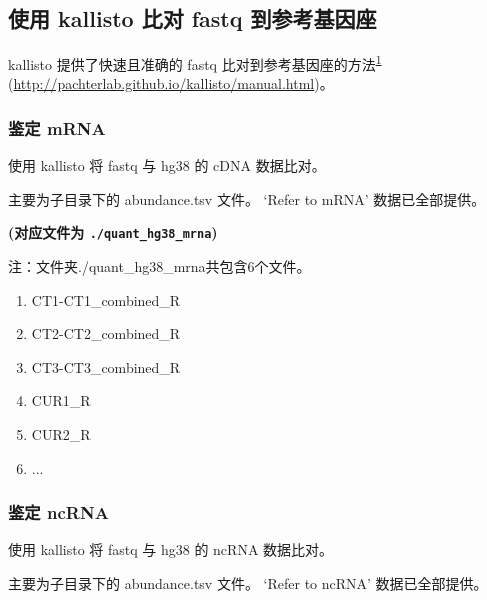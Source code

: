 \documentclass[
]{article}
\providecommand{\tightlist}{%
  \setlength{\itemsep}{0pt}\setlength{\parskip}{0pt}}
\begin{document}
\hypertarget{ux4f7fux7528-kallisto-ux6bd4ux5bf9-fastq-ux5230ux53c2ux8003ux57faux56e0ux5ea7}{%
\subsection{使用 kallisto 比对 fastq 到参考基因座}\label{ux4f7fux7528-kallisto-ux6bd4ux5bf9-fastq-ux5230ux53c2ux8003ux57faux56e0ux5ea7}}

kallisto 提供了快速且准确的 fastq 比对到参考基因座的方法\textsuperscript{\protect\hyperlink{ref-NearOptimalPrBray2016}{1}} (\url{http://pachterlab.github.io/kallisto/manual.html})。

\hypertarget{ux9274ux5b9a-mrna}{%
\subsubsection{鉴定 mRNA}\label{ux9274ux5b9a-mrna}}

使用 kallisto 将 fastq 与 hg38 的 cDNA 数据比对。

主要为子目录下的 abundance.tsv 文件。
`Refer to mRNA' 数据已全部提供。

\textbf{(对应文件为 \texttt{./quant\_hg38\_mrna})}

\begin{center}\begin{tcolorbox}[colback=gray!10, colframe=gray!50, width=0.9\linewidth, arc=1mm, boxrule=0.5pt]注：文件夹./quant\_hg38\_mrna共包含6个文件。

\begin{enumerate}\tightlist
\item CT1-CT1\_combined\_R
\item CT2-CT2\_combined\_R
\item CT3-CT3\_combined\_R
\item CUR1\_R
\item CUR2\_R
\item ...
\end{enumerate}\end{tcolorbox}
\end{center}

\hypertarget{ux9274ux5b9a-ncrna}{%
\subsubsection{鉴定 ncRNA}\label{ux9274ux5b9a-ncrna}}

使用 kallisto 将 fastq 与 hg38 的 ncRNA 数据比对。

主要为子目录下的 abundance.tsv 文件。
`Refer to ncRNA' 数据已全部提供。
\end{document}
